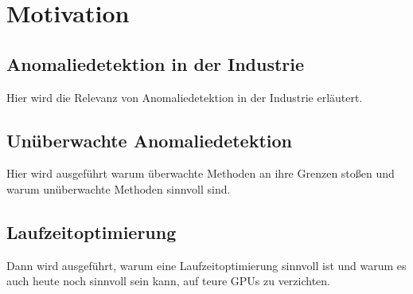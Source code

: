 
\chapter{Motivation}\label{ch:Motivation}
\section{Anomaliedetektion in der Industrie}\label{sec:AnomaliedetektionIndustrie}
Hier wird die Relevanz von Anomaliedetektion in der Industrie erläutert.\
\section{Unüberwachte Anomaliedetektion}\label{sec:UnueberwachteAnomaliedetektion}
Hier wird ausgeführt warum überwachte Methoden an ihre Grenzen stoßen und warum unüberwachte Methoden sinnvoll sind.\
\section{Laufzeitoptimierung}\label{sec:Laufzeitoptimierung}
Dann wird ausgeführt, warum eine Laufzeitoptimierung sinnvoll ist und warum es auch heute noch sinnvoll sein kann, auf teure GPUs zu verzichten.\
